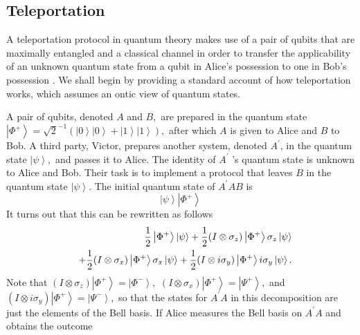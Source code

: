 \documentclass[pra,twocolumn,nofootinbib,showpacs]{revtex4}
\begin{document}
\subsection{Teleportation}

\label{teleportation}

A teleportation protocol in quantum theory makes use of a pair of qubits
that are maximally entangled and a classical channel in order to transfer
the applicability of an unknown quantum state from a qubit in Alice's
possession to one in Bob's possession \cite{teleportation}. We shall begin
by providing a standard account of how teleportation works, which assumes an
ontic view of quantum states.

A pair of qubits, denoted $A$ and $B,$ are prepared in the quantum state $%
\left| \Phi ^{+}\right\rangle =\sqrt{2}^{-1}\left( \left| 0\right\rangle
\left| 0\right\rangle +\left| 1\right\rangle \left| 1\right\rangle \right) ,$
after which $A$ is given to Alice and $B$ to Bob. A third party, Victor,
prepares another system, denoted $A^{\prime }$, in the quantum state $\left|
\psi \right\rangle ,$ and passes it to Alice. The identity of $A^{\prime }$%
's quantum state is unknown to Alice and Bob. Their task is to implement a
protocol that leaves $B$ in the quantum state $\left| \psi \right\rangle .$
The initial quantum state of $A^{\prime }AB$ is
\begin{equation}
\left| \psi \right\rangle \left| \Phi ^{+}\right\rangle
\end{equation}
It turns out that this can be rewritten as follows
\begin{eqnarray}
&&\frac{1}{2}\left| \Phi ^{+}\right\rangle \left| \psi \right\rangle +\frac{1%
}{2}(I\otimes \sigma _{z})\left| \Phi ^{+}\right\rangle \sigma _{z}\left|
\psi \right\rangle  \notag \\
&&+\frac{1}{2}(I\otimes \sigma _{x})\left| \Phi ^{+}\right\rangle \sigma
_{x}\left| \psi \right\rangle +\frac{1}{2}(I\otimes i\sigma _{y})\left| \Phi
^{+}\right\rangle i\sigma _{y}\left| \psi \right\rangle .  \notag \\
\end{eqnarray}
Note that $(I\otimes \sigma _{z})\left| \Phi ^{+}\right\rangle =\left| \Phi
^{-}\right\rangle ,$ $(I\otimes \sigma _{x})\left| \Phi ^{+}\right\rangle
=\left| \Psi ^{+}\right\rangle ,$ and $(I\otimes i\sigma _{y})\left| \Phi
^{+}\right\rangle =\left| \Psi ^{-}\right\rangle ,$ so that the states for $%
A^{\prime }A$ in this decomposition are just the elements of the Bell basis.
If Alice measures the Bell basis on $A^{\prime }A$ and obtains the outcome
\end{document}
